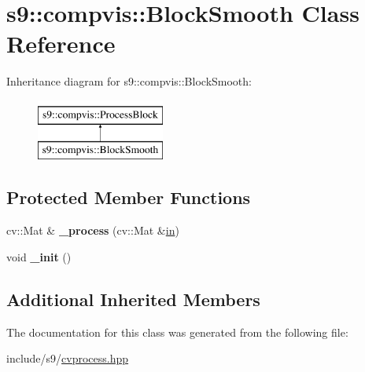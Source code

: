 \hypertarget{classs9_1_1compvis_1_1BlockSmooth}{\section{s9\-:\-:compvis\-:\-:Block\-Smooth Class Reference}
\label{classs9_1_1compvis_1_1BlockSmooth}
}
Inheritance diagram for s9\-:\-:compvis\-:\-:Block\-Smooth\-:\begin{figure}[H]
\begin{center}
\leavevmode
\includegraphics[height=2.000000cm]{classs9_1_1compvis_1_1BlockSmooth}
\end{center}
\end{figure}
\subsection*{Protected Member Functions}
\begin{DoxyCompactItemize}
\item 
\hypertarget{classs9_1_1compvis_1_1BlockSmooth_aca7037ceb9993dc9d809f14367f1318b}{cv\-::\-Mat \& {\bfseries \-\_\-process} (cv\-::\-Mat \&\hyperlink{structin}{in})}\label{classs9_1_1compvis_1_1BlockSmooth_aca7037ceb9993dc9d809f14367f1318b}

\item 
\hypertarget{classs9_1_1compvis_1_1BlockSmooth_a16c965bc021eb6e91e36989ebdd69236}{void {\bfseries \-\_\-init} ()}\label{classs9_1_1compvis_1_1BlockSmooth_a16c965bc021eb6e91e36989ebdd69236}

\end{DoxyCompactItemize}
\subsection*{Additional Inherited Members}


The documentation for this class was generated from the following file\-:\begin{DoxyCompactItemize}
\item 
include/s9/\hyperlink{cvprocess_8hpp}{cvprocess.\-hpp}\end{DoxyCompactItemize}
